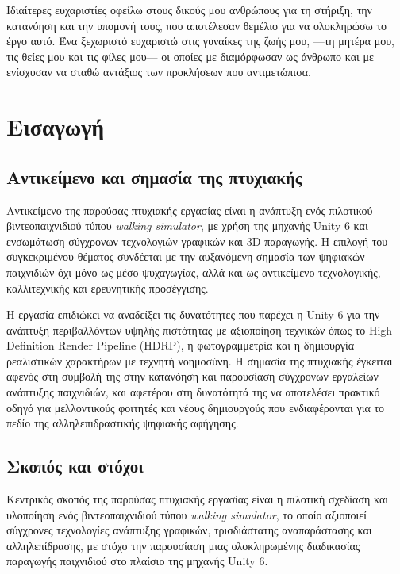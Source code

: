 Ιδιαίτερες ευχαριστίες οφείλω στους δικούς μου ανθρώπους για τη στήριξη,
την κατανόηση και την υπομονή τους, που αποτέλεσαν θεμέλιο για να
ολοκληρώσω το έργο αυτό. Ένα ξεχωριστό ευχαριστώ στις γυναίκες της ζωής
μου, —τη μητέρα μου, τις θείες μου και τις φίλες μου— οι οποίες με διαμόρφωσαν ως άνθρωπο και με ενίσχυσαν να σταθώ αντάξιος των προκλήσεων που αντιμετώπισα.



\chapter{Εισαγωγή}
\section{Αντικείμενο και σημασία της πτυχιακής}
Αντικείμενο της παρούσας πτυχιακής εργασίας είναι η ανάπτυξη ενός
πιλοτικού βιντεοπαιχνιδιού τύπου \textit{walking simulator}, με χρήση
της μηχανής Unity 6 και ενσωμάτωση σύγχρονων τεχνολογιών γραφικών και
3D παραγωγής. Η επιλογή του συγκεκριμένου θέματος συνδέεται με την
αυξανόμενη σημασία των ψηφιακών παιχνιδιών όχι μόνο ως μέσο ψυχαγωγίας,
αλλά και ως αντικείμενο τεχνολογικής, καλλιτεχνικής και ερευνητικής
προσέγγισης.

Η εργασία επιδιώκει να αναδείξει τις δυνατότητες που παρέχει η Unity 6
για την ανάπτυξη περιβαλλόντων υψηλής πιστότητας με αξιοποίηση τεχνικών
όπως το High Definition Render Pipeline (HDRP), η φωτογραμμετρία και η
δημιουργία ρεαλιστικών χαρακτήρων με τεχνητή νοημοσύνη. Η σημασία της
πτυχιακής έγκειται αφενός στη συμβολή της στην κατανόηση και παρουσίαση
σύγχρονων εργαλείων ανάπτυξης παιχνιδιών, και αφετέρου στη δυνατότητά
της να αποτελέσει πρακτικό οδηγό για μελλοντικούς φοιτητές και νέους
δημιουργούς που ενδιαφέρονται για το πεδίο της αλληλεπιδραστικής
ψηφιακής αφήγησης.
\section{Σκοπός και στόχοι}
Κεντρικός σκοπός της παρούσας πτυχιακής εργασίας είναι η πιλοτική
σχεδίαση και υλοποίηση ενός βιντεοπαιχνιδιού τύπου \textit{walking
simulator}, το οποίο αξιοποιεί σύγχρονες τεχνολογίες ανάπτυξης
γραφικών, τρισδιάστατης αναπαράστασης και αλληλεπίδρασης, με στόχο την
παρουσίαση μιας ολοκληρωμένης διαδικασίας παραγωγής παιχνιδιού στο
πλαίσιο της μηχανής Unity 6.

